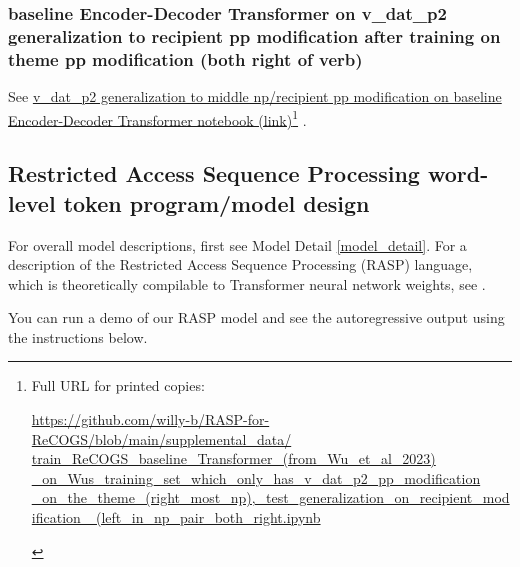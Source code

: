 \documentclass[11pt]{article}
\begin{document}
\subsubsection{\citep{Wu2023} baseline Encoder-Decoder Transformer on v\_dat\_p2 generalization to recipient pp modification after training on theme pp modification (both right of verb)}

See \href{https://github.com/willy-b/RASP-for-ReCOGS/blob/main/supplemental\_data/train\_ReCOGS\_baseline\_Transformer\_(from\_Wu\_et\_al\_2023)\_on\_Wus\_training\_set\_which\_only\_has\_v\_dat\_p2\_pp\_modification\_on\_the\_theme\_(right\_most\_np),\_test\_generalization\_on\_recipient\_modification\_(left\_in\_np\_pair\_both\_right.ipynb}{v\_dat\_p2 generalization to middle np/recipient pp modification on baseline Encoder-Decoder Transformer notebook (link)}\footnote{\begin{tiny}Full URL for printed copies: 

\href{https://github.com/willy-b/RASP-for-ReCOGS/blob/main/supplemental\_data/train\_ReCOGS\_baseline\_Transformer\_(from\_Wu\_et\_al\_2023)\_on\_Wus\_training\_set\_which\_only\_has\_v\_dat\_p2\_pp\_modification\_on\_the\_theme\_(right\_most\_np),\_test\_generalization\_on\_recipient\_modification\_(left\_in\_np\_pair\_both\_right.ipynb}{https://github.com/willy-b/RASP-for-ReCOGS/blob/main/supplemental\_data/
train\_ReCOGS\_baseline\_Transformer\_(from\_Wu\_et\_al\_2023)
\_on\_Wus\_training\_set\_which\_only\_has\_v\_dat\_p2\_pp\_modification
\_on\_the\_theme\_(right\_most\_np),\_test\_generalization\_on\_recipient\_modification
\_(left\_in\_np\_pair\_both\_right.ipynb}
\end{tiny}} .

\twocolumn

\clearpage

\subsection{Restricted Access Sequence Processing word-level token program/model design}
\label{rasp-word-level-model-design}

For overall model descriptions, first see Model Detail \ref{model_detail}.
For a description of the Restricted Access Sequence Processing (RASP) language, which is theoretically compilable to Transformer neural network weights, see \citep{Weiss2021}.

You can run a demo of our RASP model and see the autoregressive output using the instructions below.
\end{document}
